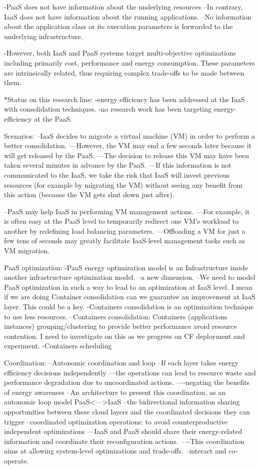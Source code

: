 -PaaS does not have information about the underlying resources
--In contrary, IaaS does not have information about the running applications.
--No information about the application class or its execution parameters is forwarded to the underlying infrastructure.


-However, both IaaS and PaaS systems target multi-objective optimizations including primarily cost, performance and energy consumption. These parameters are intrinsically related, thus requiring complex trade-offs to be made between them.

*Status on this research line:
-energy efficiency has been addressed at the IaaS with consolidation techniques.
-no research work has been targeting energy-efficiency at the PaaS.

Scenarios: 
--IaaS decides to migrate a virtual machine (VM) in order to perform a better consolidation.
---However, the VM may end a few seconds later because it will get released by the PaaS.
---The decision to release this VM may have been taken several minutes in advance by the PaaS.
---If this information is not communicated to the IaaS, we take the risk that IaaS will invest previous resources (for example by migrating the VM) without seeing any benefit from this action (because the VM gets shut down just after).

--PaaS may help IaaS in performing VM management actions.
---For example, it is often easy at the PaaS level to temporarily redirect one VM’s workload to another by redefining load balancing parameters.
---Offloading a VM for just a few tens of seconds may greatly facilitate IaaS-level management tasks such as VM migration.

PaaS optimization:
-PaaS energy optimization model is an Infrastructure inside another infrastructure optimization model. 
--a new dimension.
--We need to model PaaS optimization in such a way to lead to an optimization at IaaS level. I mean if we are doing Container consolidation can we guarantee an improvement at IaaS layer. This could be a key.
-Containers consolidation is an optimization technique to use less resources.
--Containers consolidation: Containers (applications instances) grouping/clustering to provide better performance avoid resource contention. I need to investigate on this as we progress on CF deployment and experiment.
-Containers scheduling

Coordination:
--Autonomic coordination and loop
--If each layer takes energy efficiency decisions independently
---the operations can lead to resource waste and performance degradation due to uncoordinated actions.
----negating the benefits of energy awareness
--An architecture to present this coordination, as an autonomic loop model PaaS<--->IaaS
--the bidirectional information sharing opportunities between these cloud layers and the coordinated decisions they can trigger
--coordinated optimization operations: to avoid counterproductive independent optimizations
---IaaS and PaaS should share their energy-related information and coordinate their reconfiguration actions. 
----This coordination aims at allowing system-level optimizations and trade-offs.
--interact and co-operate.

